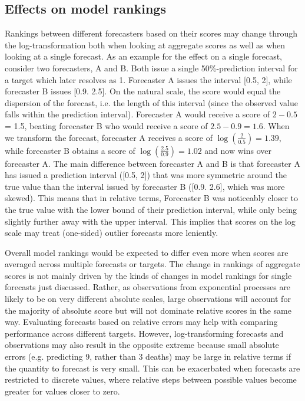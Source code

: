 \documentclass{article}
\begin{document}

\subsection{Effects on model rankings}
\label{sec:methods:rankings}
Rankings between different forecasters based on their scores may change through the log-transformation both when looking at aggregate scores as well as when looking at a single forecast. As an example for the effect on a single forecast, consider two forecasters, A and B. Both issue a single 50\%-prediction interval for a target which later resolves as 1. Forecaster A issues the interval [0.5, 2], while forecaster B issues [0.9. 2.5]. On the natural scale, the score would equal the dispersion of the forecast, i.e. the length of this interval (since the observed value falls within the prediction interval). Forecaster A would receive a score of $2 - 0.5$ = 1.5, beating forecaster B who would receive a score of $2.5 - 0.9 = 1.6$. When we transform the forecast, forecaster A receives a score of $\log (\frac{2}{0.5}) = 1.39$, while forecaster B obtains a score of $\log (\frac{2.5}{0.9}) = 1.02$ and now wins over forecaster A. The main difference between forecaster A and B is that forecaster A has issued a prediction interval ([0.5, 2]) that was more symmetric around the true value than the interval issued by forecaster B ([0.9. 2.6], which was more skewed). This means that in relative terms, Forecaster B was noticeably closer to the true value with the lower bound of their prediction interval, while only being slightly further away with the upper interval. This implies that scores on the log scale may treat (one-sided) outlier forecasts more leniently. 

Overall model rankings would be expected to differ even more when scores are averaged across multiple forecasts or targets. The change in rankings of aggregate scores is not mainly driven by the kinds of changes in model rankings for single forecasts just discussed. Rather, as observations from exponential processes are likely to be on very different absolute scales, large observations will account for the majority of absolute score but will not dominate relative scores in the same way. Evaluating forecasts based on relative errors may help with comparing performance across different targets. However, log-transforming forecasts and observations may also result in the opposite extreme because small absolute errors (e.g. predicting 9, rather than 3 deaths) may be large in relative terms if the quantity to forecast is very small. This can be exacerbated when forecasts are restricted to discrete values, where relative steps between possible values become greater for values closer to zero. 
\end{document}
